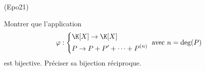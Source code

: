 \begin{tiny}(Epo21)\end{tiny} Montrer que l'application
\begin{displaymath}
 \varphi :
\left\lbrace 
\begin{aligned}
 &\K[X] \rightarrow \K[X]\\
 &P \rightarrow P+P'+\cdots +P^{(n)}
\end{aligned}
\right. \text{ avec } n=\deg(P)
\end{displaymath}
est bijective. Préciser sa bijection réciproque.
